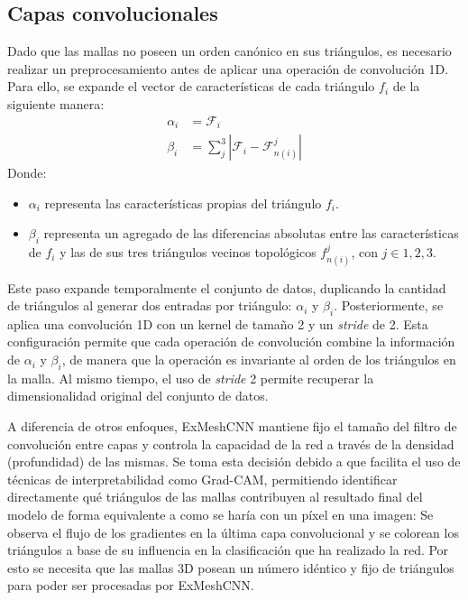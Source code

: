 \FloatBarrier
\subsection{Capas convolucionales}
Dado que las mallas no poseen un orden canónico en sus triángulos, es necesario realizar un preprocesamiento antes de aplicar una operación de convolución 1D. Para ello, se expande el vector de características de cada triángulo $f_i$ de la siguiente manera:
\begin{align}
    \alpha_i &= \mathcal{F}_{i} \\
    \beta_i &= \sum_{j}^{3} | \mathcal{F}_{i} - \mathcal{F}_{n(i)}^{j}| 
\end{align}
Donde:
\begin{itemize}
    \item $\alpha_i$ representa las características propias del triángulo $f_i$.
    \item $\beta_i$ representa un agregado de las diferencias absolutas entre las características de $f_i$ y las de sus tres triángulos vecinos topológicos $f_{n(i)}^{j}$, con $j \in {1, 2, 3}$.
\end{itemize}

Este paso expande temporalmente el conjunto de datos, duplicando la cantidad de triángulos al generar dos entradas por triángulo: $\alpha_i$ y $\beta_i$. Posteriormente, se aplica una convolución 1D con un kernel de tamaño 2 y un \textit{stride} de 2. Esta configuración permite que cada operación de convolución combine la información de $\alpha_i$ y $\beta_i$, de manera que la operación es invariante al orden de los triángulos en la malla. Al mismo tiempo, el uso de \textit{stride} 2 permite recuperar la dimensionalidad original del conjunto de datos.

A diferencia de otros enfoques, ExMeshCNN mantiene fijo el tamaño del filtro de convolución entre capas y controla la capacidad de la red a través de la densidad (profundidad) de las mismas. Se toma esta decisión debido a que facilita el uso de técnicas de interpretabilidad como Grad-CAM, permitiendo identificar directamente qué triángulos de las mallas contribuyen al resultado final del modelo de forma equivalente a como se haría con un píxel en una imagen: Se observa el flujo de los gradientes en la última capa convolucional y se colorean los triángulos a base de su influencia en la clasificación que ha realizado la red. Por esto se necesita que las mallas 3D posean un número idéntico y fijo de triángulos para poder ser procesadas por ExMeshCNN.

